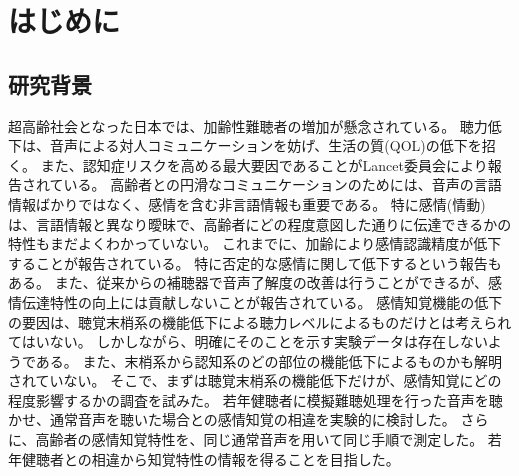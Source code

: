 
\chapter{はじめに}
\label{chap:Intro}


\section{研究背景}
\label{sec:研究背景}
超高齢社会となった日本では、加齢性難聴者の増加が懸念されている。
聴力低下は、音声による対人コミュニケーションを妨げ、生活の質(QOL)の低下を招く。
また、認知症リスクを高める最大要因であることがLancet委員会により報告されている\cite{livingston2020dementia}。
高齢者との円滑なコミュニケーションのためには、音声の言語情報ばかりではなく、感情を含む非言語情報も重要である。
特に感情(情動)は、言語情報と異なり曖昧で、高齢者にどの程度意図した通りに伝達できるかの特性もまだよくわかっていない。
これまでに、加齢により感情認識精度が低下することが報告されている\cite{paulmann2008aging,ben2019age,amorim2021changes}。
特に否定的な感情に関して低下するという報告もある\cite{mill2009age}。
また、従来からの補聴器で音声了解度の改善は行うことができるが、感情伝達特性の向上には貢献しないことが報告されている\cite{goy2018hearing}。
感情知覚機能の低下の要因は、聴覚末梢系の機能低下による聴力レベルによるものだけとは考えられてはいない。
しかしながら、明確にそのことを示す実験データは存在しないようである。
また、末梢系から認知系のどの部位の機能低下によるものかも解明されていない。
そこで、まずは聴覚末梢系の機能低下だけが、感情知覚にどの程度影響するかの調査を試みた。
若年健聴者に模擬難聴処理を行った音声を聴かせ、通常音声を聴いた場合との感情知覚の相違を実験的に検討した。
さらに、高齢者の感情知覚特性を、同じ通常音声を用いて同じ手順で測定した。
若年健聴者との相違から知覚特性の情報を得ることを目指した。

